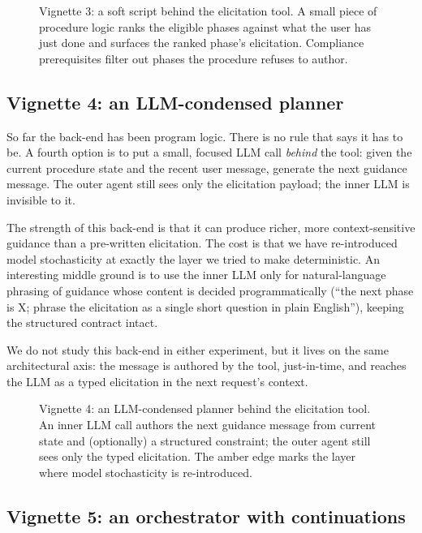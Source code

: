 \documentclass[11pt,a4paper]{article}
\begin{document}
\begin{figure}[htbp]
  \centering
  
  \caption{Vignette 3: a soft script behind the elicitation tool. A small
  piece of procedure logic ranks the eligible phases against what the user
  has just done and surfaces the ranked phase's elicitation. Compliance
  prerequisites filter out phases the procedure refuses to author.}
  \label{fig:tool-internals-soft-script}
\end{figure}

\subsection{Vignette 4: an LLM-condensed planner}

So far the back-end has been program logic. There is no rule that says it has to be. A fourth option is to put a small, focused LLM call \emph{behind} the tool: given the current procedure state and the recent user message, generate the next guidance message. The outer agent still sees only the elicitation payload; the inner LLM is invisible to it.

The strength of this back-end is that it can produce richer, more context-sensitive guidance than a pre-written elicitation. The cost is that we have re-introduced model stochasticity at exactly the layer we tried to make deterministic. An interesting middle ground is to use the inner LLM only for natural-language phrasing of guidance whose content is decided programmatically (``the next phase is X; phrase the elicitation as a single short question in plain English''), keeping the structured contract intact.

We do not study this back-end in either experiment, but it lives on the same architectural axis: the message is authored by the tool, just-in-time, and reaches the LLM as a typed elicitation in the next request's context.

\begin{figure}[htbp]
  \centering
  
  \caption{Vignette 4: an LLM-condensed planner behind the elicitation tool.
  An inner LLM call authors the next guidance message from current state
  and (optionally) a structured constraint; the outer agent still sees only
  the typed elicitation. The amber edge marks the layer where model
  stochasticity is re-introduced.}
  \label{fig:tool-internals-llm-planner}
\end{figure}

\subsection{Vignette 5: an orchestrator with continuations}
\end{document}
